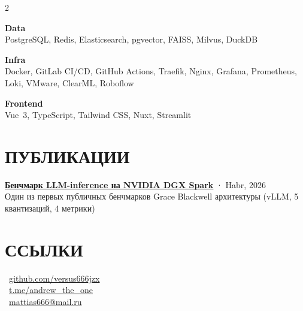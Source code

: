 \documentclass[]{deedy-resume-reversed}
\begin{document}
\begin{paracol}{2}
{\textbf{Data}\\
PostgreSQL, Redis, Elasticsearch, pgvector, FAISS, Milvus, DuckDB
\vspace{4pt}

\textbf{Infra}\\
Docker, GitLab CI/CD, GitHub Actions, Traefik, Nginx, Grafana, Prometheus, Loki, VMware, ClearML, Roboflow
\vspace{4pt}

\textbf{Frontend}\\
Vue~3, TypeScript, Tailwind CSS, Nuxt, Streamlit
}
\sectionsep


\section{ПУБЛИКАЦИИ}

{\fontsize{9pt}{11pt}\selectfont
\href{https://habr.com/ru/articles/994058/}{\textbf{Бенчмарк LLM-inference на NVIDIA DGX Spark}} · Habr, 2026\\[2pt]
Один из первых публичных бенчмарков Grace Blackwell архитектуры (vLLM, 5 квантизаций, 4 метрики)
}
\sectionsep


\section{ССЫЛКИ}

{\fontsize{9pt}{11pt}\selectfont
\faGithub\ \href{https://github.com/versus666jzx}{github.com/versus666jzx}\\[3pt]
\faTelegram\ \href{https://t.me/andrew_the_one}{t.me/andrew\_the\_one}\\[3pt]
\faEnvelope\ \href{mailto:mattias666@mail.ru}{mattias666@mail.ru}
}

\end{paracol}
\end{document}
